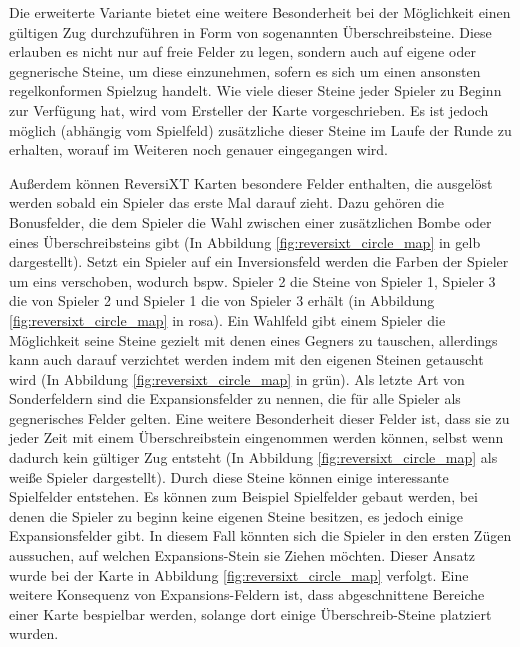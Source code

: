 \documentclass[12pt,a4paper,bibliography=totocnumbered,listof=totocnumbered]{article}
\begin{document}
Die erweiterte Variante bietet eine weitere Besonderheit bei der Möglichkeit einen gültigen Zug durchzuführen in Form von sogenannten Überschreibsteine. Diese erlauben es nicht nur auf freie Felder zu legen, sondern auch auf eigene oder gegnerische Steine, um diese einzunehmen, sofern es sich um einen ansonsten regelkonformen Spielzug handelt. Wie viele dieser Steine jeder Spieler zu Beginn zur Verfügung hat, wird vom Ersteller der Karte vorgeschrieben. Es ist jedoch möglich (abhängig vom Spielfeld) zusätzliche dieser Steine im Laufe der Runde zu erhalten, worauf im Weiteren noch genauer eingegangen wird. 

Außerdem können ReversiXT Karten besondere Felder enthalten, die ausgelöst werden sobald ein Spieler das erste Mal darauf zieht. Dazu gehören die Bonusfelder, die dem Spieler die Wahl zwischen einer zusätzlichen Bombe oder eines Überschreibsteins gibt (In Abbildung \ref{fig:reversixt_circle_map} in gelb dargestellt). Setzt ein Spieler auf ein Inversionsfeld werden die Farben der Spieler um eins verschoben, wodurch bspw. Spieler 2 die Steine von Spieler 1, Spieler 3 die von Spieler 2 und Spieler 1 die von Spieler 3 erhält (in Abbildung \ref{fig:reversixt_circle_map} in rosa). Ein Wahlfeld gibt einem Spieler die Möglichkeit seine Steine gezielt mit denen eines Gegners zu tauschen, allerdings kann auch darauf verzichtet werden indem mit den eigenen Steinen \glqq getauscht\grqq{} wird (In Abbildung \ref{fig:reversixt_circle_map} in grün). Als letzte Art von Sonderfeldern sind die Expansionsfelder zu nennen, die für alle Spieler als gegnerisches Felder gelten. Eine weitere Besonderheit dieser Felder ist, dass sie zu jeder Zeit mit einem Überschreibstein eingenommen werden können, selbst wenn dadurch kein gültiger Zug entsteht (In Abbildung \ref{fig:reversixt_circle_map} als weiße Spieler dargestellt). Durch diese Steine können einige interessante Spielfelder entstehen. Es können zum Beispiel Spielfelder gebaut werden, bei denen die Spieler zu beginn keine eigenen Steine besitzen, es jedoch einige Expansionsfelder gibt. In diesem Fall könnten sich die Spieler in den ersten Zügen aussuchen, auf welchen Expansions-Stein sie Ziehen möchten. Dieser Ansatz wurde bei der Karte in Abbildung \ref{fig:reversixt_circle_map} verfolgt. Eine weitere Konsequenz von Expansions-Feldern ist, dass abgeschnittene Bereiche einer Karte bespielbar werden, solange dort einige Überschreib-Steine platziert wurden.
\end{document}
